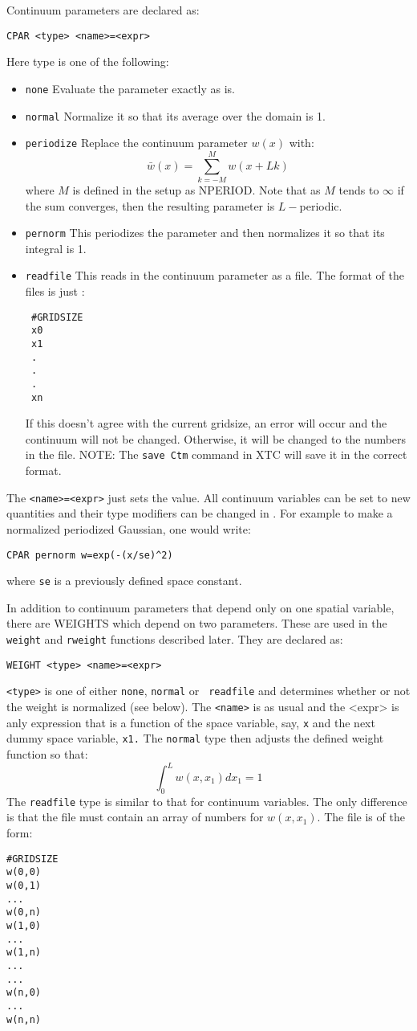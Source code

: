 Continuum parameters are declared as:
\begin{verbatim}
CPAR <type> <name>=<expr>
\end{verbatim}
Here type is one of the following:
\begin{itemize}
\item {\tt none} Evaluate the parameter exactly as is.
\item {\tt normal} Normalize it so that its average over the domain
is 1.
\item {\tt periodize} Replace the continuum parameter $w(x)$ with:
\[
 \bar w(x) = \sum_{k=-M}^{M} w(x+Lk)
\]
where $M$ is defined in the setup as NPERIOD.  Note that as  $M$ tends
to $\infty$ if the sum converges, then the resulting parameter is
$L-$periodic.  
\item {\tt pernorm} This periodizes the parameter and then normalizes
it so that its integral is 1.
\item {\tt readfile}  This reads in the continuum parameter as a file.
The format of the files is just :
\begin{verbatim}
 #GRIDSIZE
 x0
 x1
 .
 .
 .
 xn
\end{verbatim}
If this doesn't agree with the current gridsize, an error will
occur and the continuum will not be changed.  Otherwise, it will be
changed to the numbers in the file.  NOTE: The {\tt save Ctm} command
in XTC will save it in the correct format.
\end{itemize}
The {\tt <name>=<expr>} just sets the value.  All continuum variables
can be set to new quantities and their type modifiers can be changed
in \xtc.  For example to make a normalized periodized Gaussian, one
would write:
\begin{verbatim}
CPAR pernorm w=exp(-(x/se)^2)
\end{verbatim}
where {\tt se} is a previously defined space constant.

In addition to continuum parameters that depend only on one spatial
variable, there are WEIGHTS which depend on two parameters.  These are
used in the {\tt weight} and {\tt rweight} functions described later.
They are declared as:
\begin{verbatim}
WEIGHT <type> <name>=<expr>
\end{verbatim}
{\tt <type>} is one of either {\tt none}, {\tt normal}  or {\tt
readfile} and
determines whether or not the weight is normalized (see below). The
{\tt <name>} is as usual and the {<expr>} is anly expression that is a
function of the space variable, say, {\tt x} and the next dummy space
variable, {\tt x1.} The {\tt normal} type then adjusts the defined
weight function so that:
\[
 \int_0^L w(x,x_1)dx_1 = 1
\]
The {\tt readfile} type is similar to that for continuum variables.
The only difference is that the file must contain an array of numbers
for $w(x,x_1).$ The file is of the form:
\begin{verbatim}
#GRIDSIZE
w(0,0)
w(0,1)
...
w(0,n)
w(1,0)
...
w(1,n)
...
...
w(n,0)
...
w(n,n)
\end{verbatim}


